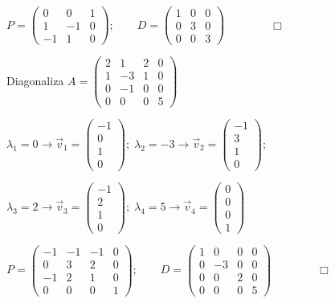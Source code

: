 $P=\left(\begin{matrix} 0&0&1\\1&-1&0\\-1&1&0  \end{matrix}\right); \qquad D=\left(\begin{matrix} 1&0&0\\0&3&0\\0&0&3  \end{matrix}\right)$$\qquad \qquad \Box$
	


\begin{miejercicio}
	Diagonaliza $A=\left(\begin{matrix} 2&1&2&0\\1&-3&1&0\\0&-1&0&0\\0&0&0&5 \end{matrix}\right)$

\end{miejercicio}



\noindent $ \lambda_1=0 \longrightarrow \vec v_1=\left( \begin{matrix} -1\\0\\1\\0 \end{matrix}\right); \; \lambda_2=-3 \longrightarrow \vec v_2=\left( \begin{matrix} -1\\3\\1\\0 \end{matrix}\right); \;$

\noindent $\lambda_3=2 \longrightarrow \vec v_3=\left( \begin{matrix} -1\\2\\1\\0 \end{matrix}\right); \; \lambda_4=5 \longrightarrow \vec v_4=\left( \begin{matrix} 0\\0\\0\\1 \end{matrix}\right)$

$P=\left(\begin{matrix} -1&-1&-1&0\\0&3&2&0\\-1&2&1&0 \\ 0&0&0&1  \end{matrix}\right); \qquad D=\left(\begin{matrix} 1&0&0&0\\0&-3&0&0\\0&0&2&0\\0&0&0&5  \end{matrix}\right)$$\qquad \qquad \Box$
	


